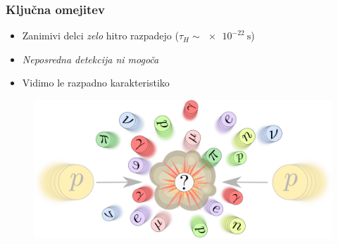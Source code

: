 \documentclass[14pt, t]{beamer}
\begin{document}
\begin{frame}

    \frametitle{Ključna omejitev}

    \begin{itemize}
    
        \item Zanimivi delci \textit{zelo} hitro razpadejo ($ \tau_{H} \sim \SI{e-22}{\second} $)

        \item \textit{Neposredna detekcija ni mogoča}

        \item Vidimo le razpadno karakteristiko
    
    \end{itemize}

    \begin{figure}
        \centering
        \includegraphics[width=\linewidth]{vector/figures-presentation/collision-question.png}
    \end{figure}

\end{frame}

    

    
    
\end{document}
